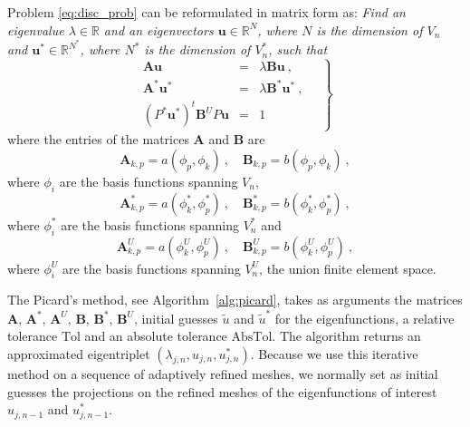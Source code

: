 \documentclass[smallextended]{svjour3}
\begin{document}
Problem \eqref{eq:disc_prob} can be reformulated in matrix form as:
\emph{Find an eigenvalue $\lambda\in \mathbb{R}$ and an eigenvectors $\mathbf{u}\in \mathbb{R}^N$, where $N$ is the dimension of $V_n$ and $\mathbf{u}^*\in \mathbb{R}^{N^*}$, where $N^*$ is the dimension of $V_n^*$,
such that}
\begin{equation}
\label{eq:disc_prob_mat}
\left.
\begin{array}{lcl}
\mathbf{A} \mathbf{u}&=& \lambda\mathbf{B}\mathbf{u}\ ,
\\
\mathbf{A}^* \mathbf{u}^*&=& \lambda\mathbf{B}^*\mathbf{u}^*\ ,
\\
(P^*\mathbf{u}^*)^t\mathbf{B}^U P\mathbf{u} &=& 1
\end{array}\quad
\right\}
\end{equation}
where the entries of the matrices $\mathbf{A}$ and $\mathbf{B}$ are 
$$
\mathbf{A}_{k,p}=a(\phi_p,\phi_k)\ ,\quad\mathbf{B}_{k,p}=b(\phi_p,\phi_k)\ ,
$$
where $\phi_i$ are the basis functions spanning $V_n$,
$$
\mathbf{A}^*_{k,p}=a(\phi_k^*,\phi_p^*)\ ,\quad\mathbf{B}^*_{k,p}=b(\phi_k^*,\phi_p^*)\ ,
$$
where $\phi_i^*$ are the basis functions spanning $V_n^*$ and
$$
\mathbf{A}^U_{k,p}=a(\phi_k^U,\phi_p^U)\ ,\quad\mathbf{B}^U_{k,p}=b(\phi_k^U,\phi_p^U)\ ,
$$
where $\phi_i^U$ are the basis functions spanning $V_n^U$, the union finite element space.



The Picard's method, see Algorithm~\ref{alg:picard}, takes as arguments the matrices $\mathbf{A}$, $\mathbf{A}^*$, $\mathbf{A}^U$, $\mathbf{B}$, $\mathbf{B}^*$, $\mathbf{B}^U$, initial guesses $\tilde u$ and $\tilde u^*$ for the eigenfunctions, a relative tolerance $\mathrm{Tol}$ and an absolute tolerance $\mathrm{AbsTol}$. 
The algorithm returns an approximated eigentriplet $(\lambda_{j,n},u_{j,n},u_{j,n}^*)$.
Because we use this iterative method on a sequence of adaptively refined meshes, we normally set as initial guesses
the projections on the refined meshes of the eigenfunctions of interest $u_{j,n-1}$ and $u_{j,n-1}^*$.
\end{document}
